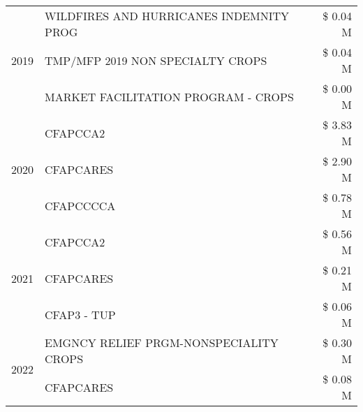 \begin{tabular}{llr}
\multirow[t]{3}{*}{2019} & WILDFIRES AND HURRICANES INDEMNITY PROG & \$ 0.04 M \\
 & TMP/MFP 2019 NON SPECIALTY CROPS & \$ 0.04 M \\
 & MARKET FACILITATION PROGRAM - CROPS & \$ 0.00 M \\
\cline{1-3}
\multirow[t]{3}{*}{2020} & CFAPCCA2 & \$ 3.83 M \\
 & CFAPCARES & \$ 2.90 M \\
 & CFAPCCCCA & \$ 0.78 M \\
\cline{1-3}
\multirow[t]{3}{*}{2021} & CFAPCCA2 & \$ 0.56 M \\
 & CFAPCARES & \$ 0.21 M \\
 & CFAP3 - TUP & \$ 0.06 M \\
\cline{1-3}
\multirow[t]{2}{*}{2022} & EMGNCY RELIEF PRGM-NONSPECIALITY CROPS & \$ 0.30 M \\
 & CFAPCARES & \$ 0.08 M \\
\cline{1-3}
\bottomrule
\end{tabular}
